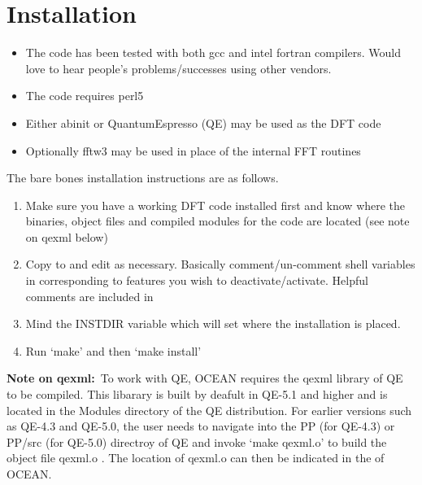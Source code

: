\documentclass[11pt]{report}
\begin{document}
\appendix
\chapter{Installation}
\begin{itemize}
\item The code has been tested with both gcc and intel fortran compilers. Would love to hear people's problems/successes using other vendors. 
\item The code requires perl5
\item Either {\sc abinit} or {\sc QuantumEspresso} (QE) may be used as the DFT code
\item Optionally {\sc fftw3} may be used in place of the internal FFT routines
\end{itemize}

The bare bones installation instructions are as follows.

\begin{enumerate}
\item{ Make sure you have a working DFT code installed first and know where the binaries, object files and compiled modules for the code are located (see note on qexml below)}
\item{ Copy  to  and edit as necessary. Basically comment/un-comment shell variables 
in  corresponding to features you wish to deactivate/activate. Helpful comments are included in  }
\item{ Mind the INSTDIR variable which will set where the installation is placed. }
\item{ Run `make' and then `make install'}
\end{enumerate}

\textbf{Note on qexml:}~To work with QE, OCEAN requires the qexml library of QE to be compiled. This libarary is built by deafult in QE-5.1 and higher 
and is located in the Modules directory of the QE distribution. For earlier versions such as QE-4.3 and QE-5.0, the user needs to navigate 
into the PP (for QE-4.3) or PP/src (for QE-5.0) directroy of QE and invoke `make qexml.o' to build the object file qexml.o . The 
location of qexml.o can then be indicated in the  of OCEAN.
\end{document}
